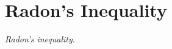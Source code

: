 \documentclass[inequalities.tex]{subfile}
\begin{document}
	\section{Radon's Inequality}\label{sec:radon}
	\emph{Radon's inequality}. \textcite{johann_radon_1913}
\end{document}
